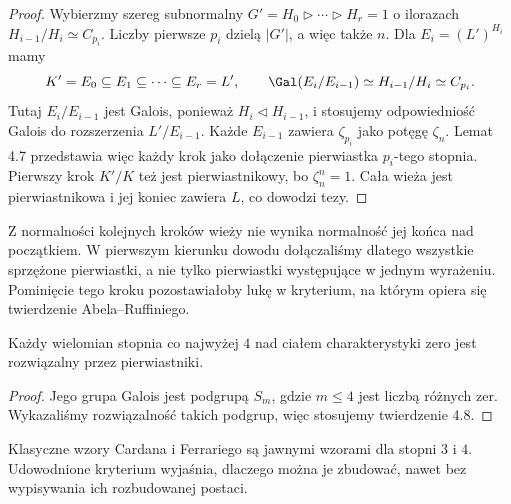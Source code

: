 \begin{proof}
Wybierzmy szereg subnormalny $G'=H_0\triangleright\cdots\triangleright H_r=1$ o ilorazach $H_{i-1}/H_i\simeq C_{p_i}$. Liczby pierwsze $p_i$ dzielą $|G'|$, a więc także $n$. Dla $E_i=(L')^{H_i}$ mamy
\[
K'=E_0\subseteq E_1\subseteq\cdots\subseteq E_r=L',
\qquad \Gal(E_i/E_{i-1})\simeq H_{i-1}/H_i\simeq C_{p_i}.
\]
Tutaj $E_i/E_{i-1}$ jest Galois, ponieważ $H_i\triangleleft H_{i-1}$, i stosujemy odpowiedniość Galois do rozszerzenia $L'/E_{i-1}$.
Każde $E_{i-1}$ zawiera $\zeta_{p_i}$ jako potęgę $\zeta_n$. Lemat 4.7 przedstawia więc każdy krok jako dołączenie pierwiastka $p_i$-tego stopnia. Pierwszy krok $K'/K$ też jest pierwiastnikowy, bo $\zeta_n^n=1$. Cała wieża jest pierwiastnikowa i jej koniec zawiera $L$, co dowodzi tezy.
\end{proof}

\begin{uwaga}
Z normalności kolejnych kroków wieży nie wynika normalność jej końca nad początkiem. W pierwszym kierunku dowodu dołączaliśmy dlatego wszystkie sprzężone pierwiastki, a nie tylko pierwiastki występujące w jednym wyrażeniu. Pominięcie tego kroku pozostawiałoby lukę w kryterium, na którym opiera się twierdzenie Abela--Ruffiniego.
\end{uwaga}

\begin{wniosek}
Każdy wielomian stopnia co najwyżej $4$ nad ciałem charakterystyki zero jest rozwiązalny przez pierwiastniki.
\end{wniosek}
\begin{proof}
Jego grupa Galois jest podgrupą $S_m$, gdzie $m\le4$ jest liczbą różnych zer. Wykazaliśmy rozwiązalność takich podgrup, więc stosujemy twierdzenie 4.8.
\end{proof}

Klasyczne wzory Cardana i Ferrariego są jawnymi wzorami dla stopni $3$ i $4$. Udowodnione kryterium wyjaśnia, dlaczego można je zbudować, nawet bez wypisywania ich rozbudowanej postaci.


